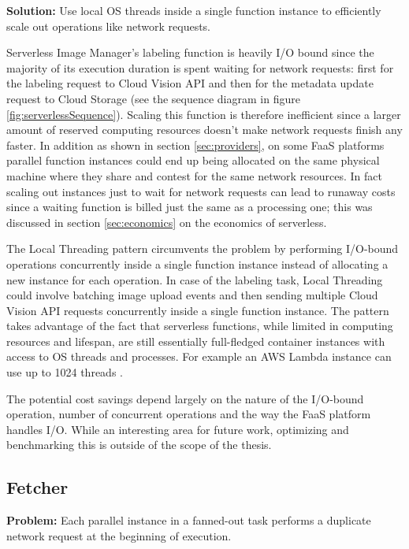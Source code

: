 
\textbf{Solution:} Use local OS threads inside a single function instance to efficiently scale out operations like network requests.

Serverless Image Manager's labeling function is heavily I/O bound since the majority of its execution duration is spent waiting for network requests: first for the labeling request to Cloud Vision API and then for the metadata update request to Cloud Storage (see the sequence diagram in figure \ref{fig:serverlessSequence}). Scaling this function is therefore inefficient since a larger amount of reserved computing resources doesn't make network requests finish any faster. In addition as shown in section \ref{sec:providers}, on some FaaS platforms parallel function instances could end up being allocated on the same physical machine where they share and contest for the same network resources. In fact scaling out instances just to wait for network requests can lead to runaway costs since a waiting function is billed just the same as a processing one; this was discussed in section \ref{sec:economics} on the economics of serverless.

The Local Threading pattern circumvents the problem by performing I/O-bound operations concurrently inside a single function instance instead of allocating a new instance for each operation. In case of the labeling task, Local Threading could involve batching image upload events and then sending multiple Cloud Vision API requests concurrently inside a single function instance. The pattern takes advantage of the fact that serverless functions, while limited in computing resources and lifespan, are still essentially full-fledged container instances with access to OS threads and processes. For example an AWS Lambda instance can use up to 1024 threads \parencite{awslambda0218}.

The potential cost savings depend largely on the nature of the I/O-bound operation, number of concurrent operations and the way the FaaS platform handles I/O. While an interesting area for future work, optimizing and benchmarking this is outside of the scope of the thesis.

\subsection{Fetcher} \label{subsec:Fetcher}

\textbf{Problem:} Each parallel instance in a fanned-out task performs a duplicate network request at the beginning of execution.

